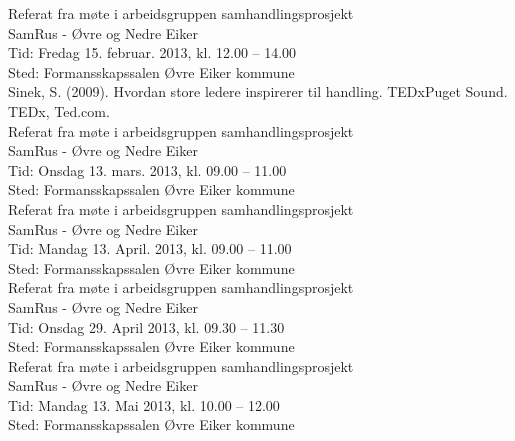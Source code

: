 \documentclass[11pt]{report} %
\begin{document}
\begin{thebibliography}{99}
                  Referat fra møte i arbeidsgruppen samhandlingsprosjekt\\ 
                  SamRus - Øvre og Nedre Eiker\\
                  Tid: Fredag 15. februar. 2013,  kl. 12.00 – 14.00\\
                  Sted: Formansskapssalen Øvre Eiker kommune\\

                  Sinek, S. (2009). Hvordan store ledere inspirerer til handling. TEDxPuget Sound. TEDx, Ted.com.\\

                  Referat fra møte i arbeidsgruppen samhandlingsprosjekt\\ 
                  SamRus - Øvre og Nedre Eiker\\
                  Tid: Onsdag 13. mars. 2013,  kl. 09.00 – 11.00\\
                  Sted: Formansskapssalen Øvre Eiker kommune\\

                  Referat fra møte i arbeidsgruppen samhandlingsprosjekt\\ 
                  SamRus - Øvre og Nedre Eiker\\
                  Tid: Mandag 13. April. 2013,  kl. 09.00 – 11.00\\
                  Sted: Formansskapssalen Øvre Eiker kommune\\

                  Referat fra møte i arbeidsgruppen samhandlingsprosjekt\\ 
                  SamRus - Øvre og Nedre Eiker\\
                  Tid: Onsdag 29. April 2013,  kl. 09.30 – 11.30\\
                  Sted: Formansskapssalen Øvre Eiker kommune\\

                  Referat fra møte i arbeidsgruppen samhandlingsprosjekt\\ 
                  SamRus - Øvre og Nedre Eiker\\
                  Tid: Mandag 13. Mai 2013,  kl. 10.00 – 12.00\\
                  Sted: Formansskapssalen Øvre Eiker kommune\\


\end{thebibliography}
\end{document}

